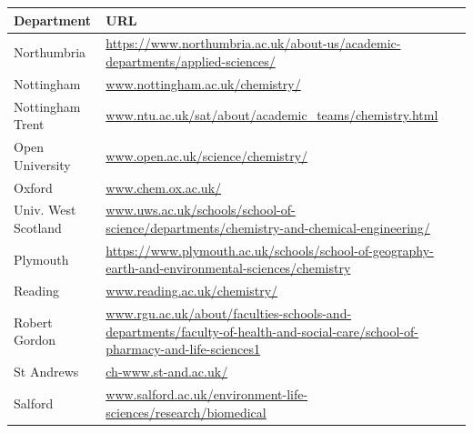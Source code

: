  \begin{table}[H]
 \begin{tabular}{||p{4cm}|Y||}
\hline
 Department                         & URL \\
\hline
 \footnotesize{Northumbria}                        & \footnotesize{\url{https://www.northumbria.ac.uk/about-us/academic-departments/applied-sciences/}}\\
 \footnotesize{Nottingham                  }       & \footnotesize{\url{www.nottingham.ac.uk/chemistry/}}                                                                                               \\
 \footnotesize{Nottingham Trent}        & \footnotesize{\url{www.ntu.ac.uk/sat/about/academic\_teams/chemistry.html}}                                                                         \\
\footnotesize{ Open University }                   & \footnotesize{\url{www.open.ac.uk/science/chemistry/}}                                                                                             \\
 \footnotesize{Oxford}                             & \footnotesize{\url{www.chem.ox.ac.uk/}}                                                                                                            \\
 \footnotesize{Univ. West Scotland} & \footnotesize{\url{www.uws.ac.uk/schools/school-of-science/departments/chemistry-and-chemical-engineering/}}                                       \\
 \footnotesize{Plymouth               }            & \footnotesize{\url{https://www.plymouth.ac.uk/schools/school-of-geography-earth-and-environmental-sciences/chemistry}}                                    \\
\footnotesize{Reading               }             & \footnotesize{\url{www.reading.ac.uk/chemistry/}}                                                                                                  \\
 \footnotesize{Robert Gordon        }              & \footnotesize{\url{www.rgu.ac.uk/about/faculties-schools-and-departments/faculty-of-health-and-social-care/school-of-pharmacy-and-life-sciences1}} \\
 \footnotesize{St Andrews          }               & \footnotesize{\url{ch-www.st-and.ac.uk/}}                                                                                                          \\
 \footnotesize{Salford            }                & \footnotesize{\url{www.salford.ac.uk/environment-life-sciences/research/biomedical}}                                                               \\

\end{tabular}
\end{table}
